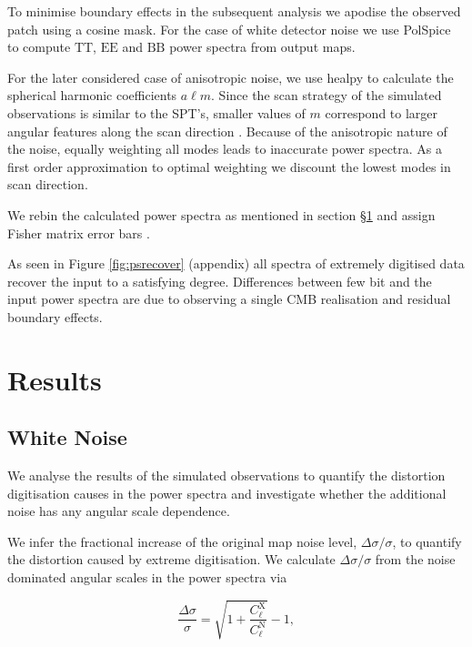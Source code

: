 \documentclass[apj]{emulateapj}
\begin{document}
To minimise boundary effects in the subsequent analysis we apodise the observed patch using a cosine mask. For the case of white detector noise we use PolSpice \citep{polspice} to compute $\mathrm{TT}$, $\mathrm{EE}$ and $\mathrm{BB}$ power spectra from output maps. 

For the later considered case of anisotropic noise, we use healpy to calculate the spherical harmonic coefficients $a\ell m$. Since the scan strategy of the simulated observations is similar to the SPT's, smaller values of $m$ correspond to larger angular features along the scan direction \citep{chown2018}. Because of the anisotropic nature of the noise, equally weighting all modes leads to inaccurate power spectra. As a first order approximation to optimal weighting we discount the lowest modes in scan direction.

We rebin the calculated power spectra as mentioned in section \S\ref{sec:results} and assign Fisher matrix error bars \citep{tegmarkdesignersguide1997}.

As seen in Figure \ref{fig:psrecover} (appendix) all spectra of extremely digitised data recover the input to a satisfying degree. Differences between few bit and the input power spectra are due to observing a single CMB realisation and residual boundary effects.

\section{Results}
\label{sec:results}

\subsection{White Noise}
\label{subsec:whitenoise}

We analyse the results of the simulated observations to quantify the distortion digitisation causes in the power spectra and investigate whether the additional noise has any angular scale dependence.

We infer the fractional increase of the original map noise level, $\Delta \sigma / \sigma$, to quantify the distortion caused by extreme digitisation. We calculate $\Delta \sigma / \sigma$ from the noise dominated angular scales in the power spectra via

\begin{equation}
\frac{\Delta \sigma}{\sigma} = \sqrt{1 + \frac{C_\ell^\mathrm{X}}{C_\ell^{\mathrm{N}}}} - 1,
\end{equation}
\end{document}
